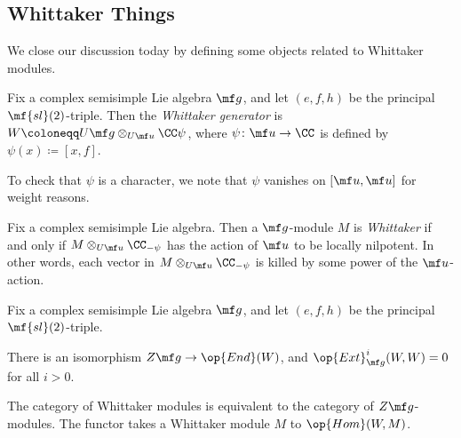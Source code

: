 \documentclass[../notes.tex]{subfiles}
\begin{document}
\subsection{Whittaker Things}
We close our discussion today by defining some objects related to Whittaker modules.
\begin{definition}
	Fix a complex semisimple Lie algebra $\mf g$, and let $(e,f,h)$ be the principal $\mf{sl}(2)$-triple. Then the \textit{Whittaker generator} is $W\coloneqq U\mf g\otimes_{U\mf u}\CC\psi$, where $\psi\colon\mf u\to\CC$ is defined by $\psi(x)\coloneqq[x,f]$.
\end{definition}
\begin{remark}
	To check that $\psi$ is a character, we note that $\psi$ vanishes on $[\mf u,\mf u]$ for weight reasons.
\end{remark}
\begin{definition}
	Fix a complex semisimple Lie algebra. Then a $\mf g$-module $M$ is \textit{Whittaker} if and only if $M\otimes_{U\mf u}\CC_{-\psi}$ has the action of $\mf u$ to be locally nilpotent. In other words, each vector in $M\otimes_{U\mf u}\CC_{-\psi}$ is killed by some power of the $\mf u$-action.
\end{definition}
\begin{theorem}[Kostant]
	Fix a complex semisimple Lie algebra $\mf g$, and let $(e,f,h)$ be the principal $\mf{sl}(2)$-triple.
	\begin{listalph}
		\item There is an isomorphism $Z\mf g\to\op{End}(W)$, and $\op{Ext}^i_{\mf g}(W,W)=0$ for all $i>0$.
		\item The category of Whittaker modules is equivalent to the category of $Z\mf g$-modules. The functor takes a Whittaker module $M$ to $\op{Hom}(W,M)$.
	\end{listalph}
\end{theorem}
\end{document}
